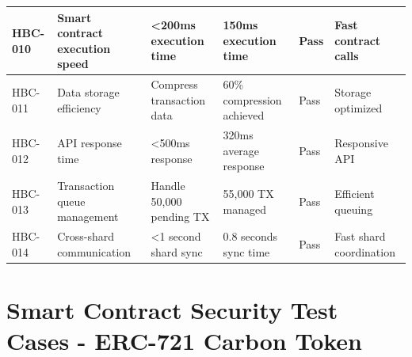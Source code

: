 \documentclass[oneside,a4paper,12pt]{book}
\begin{document}
\begin{longtable}{|p{1.2cm}|p{3cm}|p{2.3cm}|p{2.3cm}|p{1.5cm}|p{2cm}|}
HBC-010 & Smart contract execution speed & <200ms execution time & 150ms execution time & Pass & Fast contract calls \\
\hline

HBC-011 & Data storage efficiency & Compress transaction data & 60\% compression achieved & Pass & Storage optimized \\
\hline

HBC-012 & API response time & <500ms response & 320ms average response & Pass & Responsive API \\
\hline

HBC-013 & Transaction queue management & Handle 50,000 pending TX & 55,000 TX managed & Pass & Efficient queuing \\
\hline

HBC-014 & Cross-shard communication & <1 second shard sync & 0.8 seconds sync time & Pass & Fast shard coordination \\
\hline

\end{longtable}

\section{Smart Contract Security Test Cases - ERC-721 Carbon Token}
\small %
\end{document}
